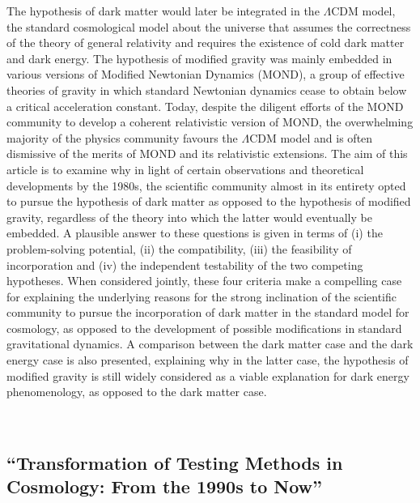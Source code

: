 \documentclass[11pt]{article}
\begin{document}






The hypothesis of dark matter would later be integrated in the $\Lambda$CDM model, the standard
cosmological model about the universe that assumes the correctness of the theory of general relativity
and requires the existence of cold dark matter and dark energy. The hypothesis of modified gravity
was mainly embedded in various versions of Modified Newtonian Dynamics (MOND), a group of
effective theories of gravity in which standard Newtonian dynamics cease to obtain below a critical
acceleration constant. Today, despite the diligent efforts of the MOND community to develop a
coherent relativistic version of MOND, the overwhelming majority of the physics community favours
the $\Lambda$CDM model and is often dismissive of the merits of MOND and its relativistic extensions.
The aim of this article is to examine why in light of certain observations and theoretical developments
by the 1980s, the scientific community almost in its entirety opted to pursue the hypothesis of dark
matter as opposed to the hypothesis of modified gravity, regardless of the theory into which the latter
would eventually be embedded. A plausible answer to these questions is given in terms of (i) the
problem-solving potential, (ii) the compatibility, (iii) the feasibility of incorporation and (iv) the
independent testability of the two competing hypotheses. When considered jointly, these four criteria
make a compelling case for explaining the underlying reasons for the strong inclination of the scientific
community to pursue the incorporation of dark matter in the standard model for cosmology, as
opposed to the development of possible modifications in standard gravitational dynamics. A
comparison between the dark matter case and the dark energy case is also presented, explaining why
in the latter case, the hypothesis of modified gravity is still widely considered as a viable explanation
for dark energy phenomenology, as opposed to the dark matter case.

\

\subsection*{\textsf{``Transformation of Testing
Methods in Cosmology: From the
1990s to Now''}}
\end{document}
